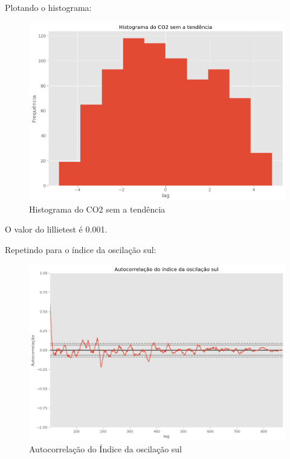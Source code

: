 \documentclass[12pt,a4paper,portuguese]{article}
\begin{document}
Plotando o histograma:
\begin{figure}[H]
	\centering
	\includegraphics[width=1\linewidth]{lista3-6d}
	\caption{Histograma do CO2 sem a tendência}
	\label{fig:lista3-6d}
\end{figure}
O valor do lillietest é 0.001.

Repetindo para o índice da oscilação sul:


\begin{figure}[H]
	\centering
	\includegraphics[width=1\linewidth]{lista3-7}
	\caption{Autocorrelação do Índice da oscilação sul}
	\label{fig:lista3-7}
\end{figure}
\end{document}
